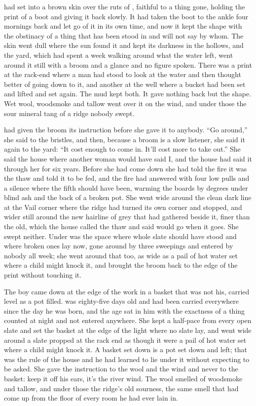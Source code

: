 
 had set into a brown skin over the ruts of , faithful to a thing gone, holding the print of a boot and giving it back slowly. It had taken the boot to the ankle four mornings back and let go of it in its own time, and now it kept the shape with the obstinacy of a thing that has been stood in and will not say by whom. The skin went dull where the sun found it and kept its darkness in the hollows, and the yard, which had spent a week walking around what the water left, went around it still with a broom and a glance and no figure spoken. There was a print at the rack-end where a man had stood to look at the water and then thought better of going down to it, and another at the well where a bucket had been set and lifted and set again. The mud kept both. It gave nothing back but the shape. Wet wool, woodsmoke and tallow went over it on the wind, and under those the sour mineral tang of a ridge nobody swept.

 had given the broom its instruction before she gave it to anybody. “Go around,” she said to the bristles, and then, because a broom is a slow listener, she said it again to the yard: “It cost enough to come in. It'll cost more to take out.” She said the house where another woman would have said I, and the house had said it through her for six years. Before she had come down she had told the fire it was the thaw and told it to be fed, and the fire had answered with four low pulls and a silence where the fifth should have been, warming the boards by degrees under blind ash and the back of a broken pot. She went wide around the clean dark line at the Vail corner where the  ridge had turned its own corner and stopped, and wider still around the new hairline of grey that had gathered beside it, finer than the old, which the house called the thaw and said would go when it goes. She swept neither. Under  was the space where whole slate should have stood and where broken ones lay now, gone around by three sweepings and entered by nobody all week; she went around that too, as wide as a pail of hot water set where a child might knock it, and brought the broom back to the edge of the print without touching it.

The boy came down at the edge of the work in a basket that was not his, carried level as a pot filled.  was eighty-five days old and had been carried everywhere since the day he was born, and the age sat in him with the exactness of a thing counted at night and not entered anywhere. She kept a half-pace from every open slate and set the basket at the edge of the light where no slate lay, and went wide around a slate propped at the rack end as though it were a pail of hot water set where a child might knock it. A basket set down is a pot set down and left; that was the rule of the house and he had learned to lie under it without expecting to be asked. She gave the instruction to the wool and the wind and never to the basket: keep it off his ears, it's the river wind. The wool smelled of woodsmoke and tallow, and under those the ridge's old sourness, the same smell that had come up from the floor of every room he had ever lain in.

